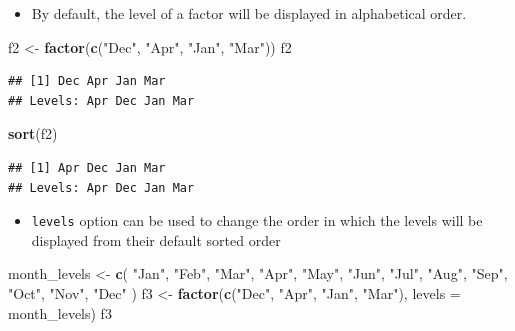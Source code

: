 \documentclass[]{book}
\newenvironment{Shaded}{\begin{snugshade}}{\end{snugshade}}
\newcommand{\DataTypeTok}[1]{\textcolor[rgb]{0.13,0.29,0.53}{#1}}
\newcommand{\KeywordTok}[1]{\textcolor[rgb]{0.13,0.29,0.53}{\textbf{#1}}}
\newcommand{\NormalTok}[1]{#1}
\newcommand{\StringTok}[1]{\textcolor[rgb]{0.31,0.60,0.02}{#1}}
\providecommand{\tightlist}{%
  \setlength{\itemsep}{0pt}\setlength{\parskip}{0pt}}
\begin{document}
\begin{itemize}
\tightlist
\item
  By default, the level of a factor will be displayed in alphabetical order.
\end{itemize}

\begin{Shaded}
\begin{Highlighting}[]
\NormalTok{f2 <-}\StringTok{ }\KeywordTok{factor}\NormalTok{(}\KeywordTok{c}\NormalTok{(}\StringTok{"Dec"}\NormalTok{, }\StringTok{"Apr"}\NormalTok{, }\StringTok{"Jan"}\NormalTok{, }\StringTok{"Mar"}\NormalTok{))}
\NormalTok{f2}
\end{Highlighting}
\end{Shaded}

\begin{verbatim}
## [1] Dec Apr Jan Mar
## Levels: Apr Dec Jan Mar
\end{verbatim}

\begin{Shaded}
\begin{Highlighting}[]
\KeywordTok{sort}\NormalTok{(f2)}
\end{Highlighting}
\end{Shaded}

\begin{verbatim}
## [1] Apr Dec Jan Mar
## Levels: Apr Dec Jan Mar
\end{verbatim}

\begin{itemize}
\tightlist
\item
  \texttt{levels} option can be used to change the order in which the levels will be displayed from their default sorted order
\end{itemize}

\begin{Shaded}
\begin{Highlighting}[]
\NormalTok{month_levels <-}\StringTok{ }\KeywordTok{c}\NormalTok{(}
  \StringTok{"Jan"}\NormalTok{, }\StringTok{"Feb"}\NormalTok{, }\StringTok{"Mar"}\NormalTok{, }\StringTok{"Apr"}\NormalTok{, }\StringTok{"May"}\NormalTok{, }\StringTok{"Jun"}\NormalTok{, }
  \StringTok{"Jul"}\NormalTok{, }\StringTok{"Aug"}\NormalTok{, }\StringTok{"Sep"}\NormalTok{, }\StringTok{"Oct"}\NormalTok{, }\StringTok{"Nov"}\NormalTok{, }\StringTok{"Dec"}
\NormalTok{)}
\NormalTok{f3 <-}\StringTok{ }\KeywordTok{factor}\NormalTok{(}\KeywordTok{c}\NormalTok{(}\StringTok{"Dec"}\NormalTok{, }\StringTok{"Apr"}\NormalTok{, }\StringTok{"Jan"}\NormalTok{, }\StringTok{"Mar"}\NormalTok{), }\DataTypeTok{levels =}\NormalTok{ month_levels)}
\NormalTok{f3}
\end{Highlighting}
\end{Shaded}
\end{document}
